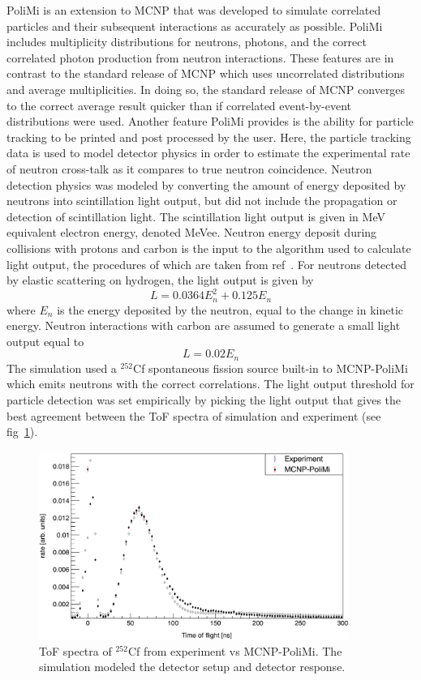 PoliMi is an extension to MCNP that was developed to simulate correlated particles and their subsequent interactions as accurately as possible.
PoliMi includes multiplicity distributions for neutrons, photons, and the correct correlated photon production from neutron interactions.
These features are in contrast to the standard release of MCNP which uses uncorrelated distributions and average multiplicities.
In doing so, the standard release of MCNP converges to the correct average result quicker than if correlated event-by-event distributions were used.
Another feature PoliMi provides is the ability for particle tracking to be printed and post processed by the user.
Here, the particle tracking data is used to model detector physics in order to estimate the experimental rate of neutron cross-talk as it compares to true neutron coincidence.
Neutron detection physics was modeled by converting the amount of energy deposited by neutrons into scintillation light output, but did not include the propagation or detection of scintillation light.
The scintillation light output is given in MeV equivalent electron energy, denoted MeVee.
Neutron energy deposit during collisions with protons and carbon is the input to the algorithm used to calculate light output, the procedures of which are taken from ref~\cite{POLIMI}.
For neutrons detected by elastic scattering on hydrogen, the light output is given by
\begin{displaymath}
L = 0.0364 E_n^2 +  0.125 E_n
\end{displaymath}
where $E_n$ is the energy deposited by the neutron, equal to the change in kinetic energy.
Neutron interactions with carbon are assumed to generate a small light output equal to
\begin{displaymath}
L = 0.02 E_n
\end{displaymath}
The simulation used a $^{252}$Cf spontaneous fission source built-in to MCNP-PoliMi which emits neutrons with the correct correlations.
The light output threshold for particle detection was set empirically by picking the light output that gives the best agreement between the ToF spectra of simulation and experiment (see fig~\ref{fig:Cf252MCNPVsEXP}).
\begin{figure}
    \centering
    \includegraphics[width = 0.9\textwidth]{Content/Methods/Cf252MCNPVsEXP.png}
    \caption{ToF spectra of $^{252}$Cf from experiment vs MCNP-PoliMi.
    The simulation modeled the detector setup and detector response.}
    \label{fig:Cf252MCNPVsEXP}
\end{figure}
